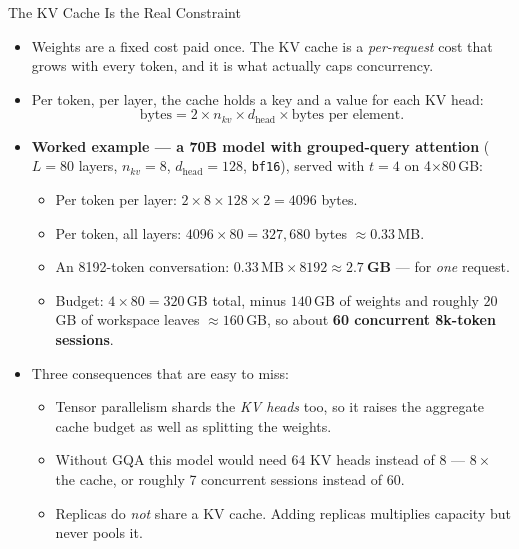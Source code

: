 \begin{frame}[allowframebreaks]{The KV Cache Is the Real Constraint}
  \begin{itemize}\footnotesize\itemsep0.3em
    \item[\textcolor{red}{$\blacktriangleright$}] Weights are a fixed cost paid once. The KV cache is a \emph{per-request} cost that grows with every token, and it is what actually caps concurrency.
    \item[\textcolor{red}{$\blacktriangleright$}] Per token, per layer, the cache holds a key and a value for each KV head:
      \[
        \text{bytes} = 2 \times n_{kv} \times d_{\text{head}} \times \text{bytes per element}.
      \]
    \item[\textcolor{red}{$\blacktriangleright$}] \textbf{Worked example --- a 70B model with grouped-query attention} ($L = 80$ layers, $n_{kv} = 8$, $d_{\text{head}} = 128$, \texttt{bf16}), served with $t = 4$ on 4$\times$80\,GB:
      \begin{itemize}\itemsep0.15em\footnotesize
        \item Per token per layer: $2 \times 8 \times 128 \times 2 = 4096$ bytes.
        \item Per token, all layers: $4096 \times 80 = 327{,}680$ bytes $\approx 0.33$\,MB.
        \item An 8192-token conversation: $0.33\,\text{MB} \times 8192 \approx \mathbf{2.7\ GB}$ --- for \emph{one} request.
        \item Budget: $4 \times 80 = 320$\,GB total, minus $140$\,GB of weights and roughly $20$\,GB of workspace leaves $\approx 160$\,GB, so about \textbf{60 concurrent 8k-token sessions}.
      \end{itemize}
    \item[\textcolor{red}{$\blacktriangleright$}] Three consequences that are easy to miss:
      \begin{itemize}\itemsep0.15em\footnotesize
        \item Tensor parallelism shards the \emph{KV heads} too, so it raises the aggregate cache budget as well as splitting the weights.
        \item Without GQA this model would need $64$ KV heads instead of $8$ --- $8\times$ the cache, or roughly 7 concurrent sessions instead of 60.
        \item Replicas do \emph{not} share a KV cache. Adding replicas multiplies capacity but never pools it.
      \end{itemize}
  \end{itemize}
\end{frame}

